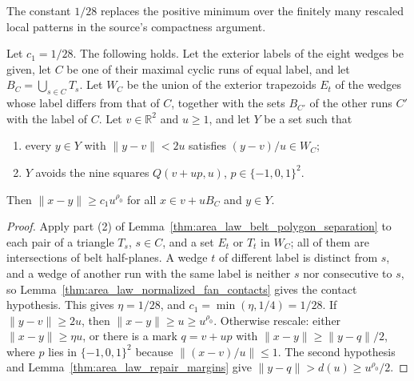 The constant $1/28$ replaces the positive minimum over the finitely many
rescaled local patterns in the source's compactness argument.

\begin{lemma}
    \label{thm:area_law_replacement_birth_separation_local}
    \leanok
    Let $c_1=1/28$. The following holds. Let the exterior labels of
    the eight wedges be given, let $C$ be one of their maximal cyclic runs of
    equal label, and let $B_C=\bigcup_{s\in C}T_s$. Let $W_C$ be the union
    of the exterior trapezoids $E_t$ of the wedges whose label differs from
    that of $C$, together with the sets $B_{C'}$ of the other runs $C'$ with
    the label of $C$. Let $v\in\mathbb R^2$ and $u\ge1$, and let $Y$ be a
    set such that
    \begin{enumerate}
        \item every $y\in Y$ with $\|y-v\|<2u$ satisfies
              $(y-v)/u\in W_C$;
        \item $Y$ avoids the nine squares $Q(v+up,u)$, $p\in\{-1,0,1\}^2$.
    \end{enumerate}
    Then $\|x-y\|\ge c_1u^{\rho_0}$ for all $x\in v+uB_C$ and $y\in Y$.
\end{lemma}

\begin{proof}
    \leanok
    Apply part (2) of Lemma~\ref{thm:area_law_belt_polygon_separation} to
    each pair of a triangle $T_s$, $s\in C$, and a set $E_t$ or $T_t$ in
    $W_C$; all of them are intersections of belt half-planes. A wedge
    $t$ of different label is distinct from $s$, and a wedge of another run
    with the same label is neither $s$ nor consecutive to $s$, so
    Lemma~\ref{thm:area_law_normalized_fan_contacts} gives the contact
    hypothesis. This gives $\eta=1/28$, and $c_1=\min(\eta,1/4)=1/28$. If $\|y-v\|\ge2u$, then $\|x-y\|\ge u\ge
        u^{\rho_0}$. Otherwise rescale: either $\|x-y\|\ge\eta u$, or there
    is a mark $q=v+up$ with $\|x-y\|\ge\|y-q\|/2$, where $p$ lies in
    $\{-1,0,1\}^2$ because $\|(x-v)/u\|\le1$. The second hypothesis and
    Lemma~\ref{thm:area_law_repair_margins} give
    $\|y-q\|>d(u)\ge u^{\rho_0}/2$.
\end{proof}

